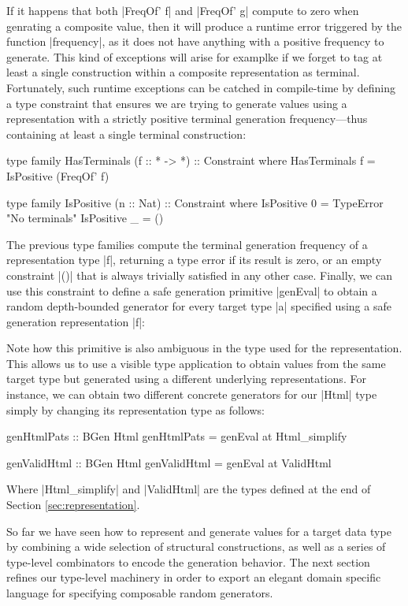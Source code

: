 If it happens that both |FreqOf' f| and |FreqOf' g| compute to zero when
genrating a composite value, then it will produce a runtime error triggered by
the function |frequency|, as it does not have anything with a positive frequency
to generate.
%
This kind of exceptions will arise for examplke if we forget to tag at least a
single construction within a composite representation as terminal.
%
Fortunately, such runtime exceptions can be catched in compile-time by defining
a type constraint that ensures we are trying to generate values using a
representation with a strictly positive terminal generation frequency---thus
containing at least a single terminal construction:

\begin{code}
type family HasTerminals (f :: * -> *) :: Constraint where
  HasTerminals f = IsPositive (FreqOf' f)

type family IsPositive (n :: Nat) :: Constraint where
  IsPositive 0 = TypeError "No terminals"
  IsPositive _ = ()
\end{code}
%
The previous type families compute the terminal generation frequency of a
representation type |f|, returning a type error if its result is zero, or an
empty constraint |()| that is always trivially satisfied in any other case.
%
Finally, we can use this constraint to define a safe generation primitive
|genEval| to obtain a random depth-bounded generator for every target type |a|
specified using a safe generation representation |f|:


Note how this primitive is also ambiguous in the type used for the
representation.
%
This allows us to use a visible type application to obtain values from the same
target type but generated using a different underlying representations.
%
For instance, we can obtain two different concrete generators for our |Html|
type simply by changing its representation type as follows:

\begin{code}
genHtmlPats :: BGen Html
genHtmlPats = genEval at Html_simplify

genValidHtml :: BGen Html
genValidHtml = genEval  at ValidHtml
\end{code}

Where |Html_simplify| and |ValidHtml| are the types defined at the end of
Section \ref{sec:representation}.


%
So far we have seen how to represent and generate values for a target data type
by combining a wide selection of structural constructions, as well as a series
of type-level combinators to encode the generation behavior.
%
The next section refines our type-level machinery in order to export an elegant
domain specific language for specifying composable random generators.
